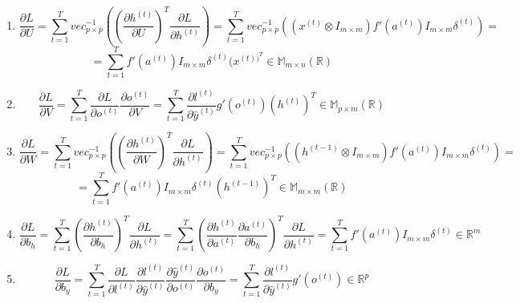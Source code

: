 \documentclass[12pt,twoside]{article}
\begin{document}
\begin{enumerate}
    \item \[\frac{\partial L}{\partial U} = \sum_{t=1}^{T} vec_{p \times p}^{-1} \left( \left( \frac{\partial h^{(t)}}{\partial U} \right)^T \frac{\partial L}{\partial h^{(t)}} \right) = \sum_{t=1}^{T} vec_{p \times p}^{-1} \left( (x^{(t)} \otimes I_{m \times m}) f'(a^{(t)}) I_{m \times m} \delta^{(t)} \right) =
    \]
    \begin{equation}
    = \sum_{t=1}^{T}f'(a^{(t)}) I_{m \times m}\delta^{(t)}(x^{(t))^T} \in \mathbb{M}_{m \times n}(\mathbb{R})
    \end{equation}
    \item \begin{equation} \frac{\partial L}{\partial V} = \sum_{t=1}^{T} \frac{\partial L}{\partial o^{(t)}} \frac{\partial o^{(t)}}{\partial V} = \sum_{t=1}^{T} \frac{\partial l^{(t)}}{\partial \hat{y}^{(t)}} g'(o^{(t)})(h^{(t)})^T \in \mathbb{M}_{p \times m}(\mathbb{R})
    \end{equation}
    \item \[ \frac{\partial L}{\partial W} = \sum_{t=1}^{T} vec_{p \times p}^{-1} \left( \left( \frac{\partial h^{(t)}}{\partial W} \right)^T \frac{\partial L}{\partial h^{(t)}} \right) = \sum_{t=1}^{T} vec_{p \times p}^{-1} \left( (h^{(t-1)} \otimes I_{m \times m}) f'(a^{(t)}) I_{m \times m} \delta^{(t)} \right) =
    \]
    \begin{equation}
    = \sum_{t=1}^{T}f'(a^{(t)}) I_{m \times m}\delta^{(t)}(h^{(t-1)})^T \in \mathbb{M}_{m \times m}(\mathbb{R})
    \end{equation}
    \item \begin{equation} \frac{\partial L}{\partial b_h} = \sum_{t=1}^{T} \left( \frac{\partial h^{(t)}}{\partial b_h}\right)^T \frac{\partial L}{\partial h^{(t)}} = \sum_{t=1}^{T} \left( \frac{\partial h^{(t)}}{\partial a^{(t)}} \frac{\partial a^{(t)}}{\partial b_h}\right)^T \frac{\partial L}{\partial h^{(t)}} =
    \sum_{t=1}^{T} f'(a^{(t)}) I_{m \times m} \delta^{(t)} \in \mathbb{R}^m
    \end{equation}
    \item \begin{equation} \frac{\partial L}{\partial b_y} = \sum_{t=1}^{T} \frac{\partial L}{\partial l^{(t)}} \frac{\partial l^{(t)}}{\partial \hat{y}^{(t)}} \frac{\partial \hat{y}^{(t)}}{\partial o^{(t)}} \frac{\partial o^{(t)}}{\partial b_y} = \sum_{t=1}^{T} \frac{\partial l^{(t)}}{\partial \hat{y}^{(t)}} g'(o^{(t)}) \in \mathbb{R}^p
    \end{equation}

\end{enumerate}
\end{document}
